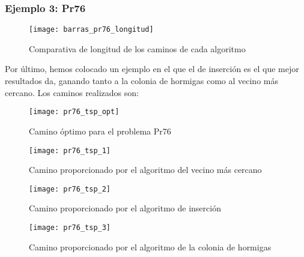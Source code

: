 \clearpage
\subsubsection{Ejemplo 3: Pr76}

\begin{figure}[h]	\texttt{[image: barras\_pr76\_longitud]} \centering
	\caption{Comparativa de longitud de los caminos de cada algoritmo} \end{figure}

Por último, hemos colocado un ejemplo en el que el de inserción es el que mejor resultados da, ganando tanto a la colonia de hormigas como al vecino más cercano. Los caminos realizados son:

\begin{figure}	\texttt{[image: pr76\_tsp\_opt]} \centering
	\caption{Camino óptimo para el problema Pr76} \end{figure}

\begin{figure}	\texttt{[image: pr76\_tsp\_1]} \centering
	\caption{Camino proporcionado por el algoritmo del vecino más cercano} \end{figure}

\begin{figure}	\texttt{[image: pr76\_tsp\_2]} \centering
	\caption{Camino proporcionado por el algoritmo de inserción} \end{figure}

\begin{figure}	\texttt{[image: pr76\_tsp\_3]} \centering
	\caption{Camino proporcionado por el algoritmo de la colonia de hormigas} \end{figure}